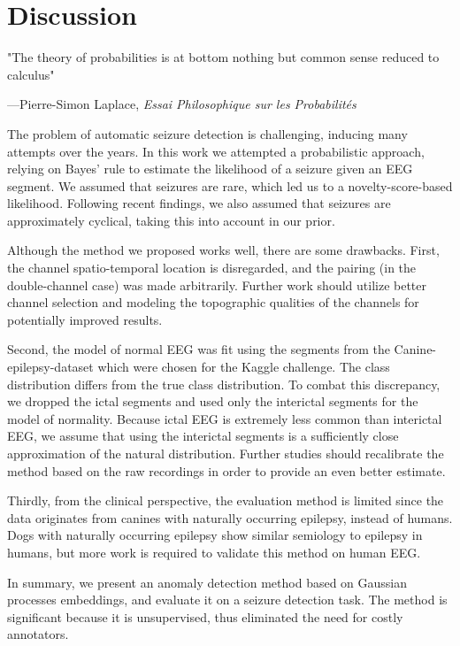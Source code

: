 \chapter{Discussion}
\label{ch:6discussion}
\epigraph{"The theory of probabilities is at bottom nothing but common sense reduced to calculus"}{---Pierre-Simon Laplace, \textit{Essai Philosophique sur les Probabilités}}


The problem of automatic seizure detection is challenging, inducing many attempts over the years. In this work we attempted a probabilistic approach, relying on Bayes' rule to estimate the likelihood of a seizure given an EEG segment. We assumed that seizures are rare, which led us to a novelty-score-based likelihood. Following recent findings, we also assumed that seizures are approximately cyclical, taking this into account in our prior.

\showthe\textwidth



Although the method we proposed works well, there are some drawbacks. First, the channel spatio-temporal location is disregarded, and the pairing (in the double-channel case) was made arbitrarily. Further work should utilize better channel selection and modeling the topographic qualities of the channels for potentially improved results.

Second, the model of normal EEG was fit using the segments from the Canine-epilepsy-dataset which were chosen for the Kaggle challenge. The class distribution differs from the true class distribution. To combat this discrepancy, we dropped the ictal segments and used only the interictal segments for the model of normality. Because ictal EEG is extremely less common than interictal EEG, we assume that using the interictal segments is a sufficiently close approximation of the natural distribution. Further studies should recalibrate the method based on the raw recordings in order to provide an even better estimate.

Thirdly, from the clinical perspective, the evaluation method is limited since the data originates from canines with naturally occurring epilepsy, instead of humans. Dogs with naturally occurring epilepsy show similar semiology to epilepsy in humans, but more work is required to validate this method on human EEG. 

In summary, we present an anomaly detection method based on Gaussian processes embeddings, and evaluate it on a seizure detection task. The method is significant because it is unsupervised, thus eliminated the need for costly annotators.
